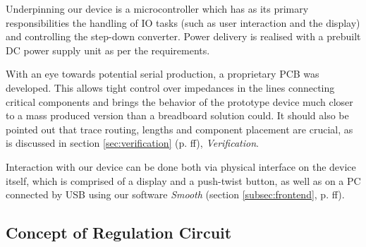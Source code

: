 
Underpinning  our  device  is  a  microcontroller which  has  as  its  primary
responsibilities the  handling of IO tasks  (such as user interaction  and the
display) and  controlling the step-down converter. Power  delivery is realised
with a prebuilt DC power supply unit as per the requirements.

With  an  eye towards  potential  serial  production,  a proprietary  PCB  was
developed.  This allows tight control  over impedances in the lines connecting
critical  components and  brings the  behavior  of the  prototype device  much
closer  to  a mass  produced  version  than  a breadboard  solution  could. It
should  also  be  pointed  out  that  trace  routing,  lengths  and  component
placement are crucial,  as is discussed in  section \ref{sec:verification} (p.
\pageref{sec:verification}ff), \emph{Verification}.

Interaction with  our device can  be done both  via physical interface  on the
device itself,  which is comprised  of a display  and a push-twist  button, as
well as  on a PC  connected by USB  using our software  \emph{Smooth} (section
\ref{subsec:frontend}, p. \pageref{subsec:frontend}ff).


\subsection{Concept of Regulation Circuit}

